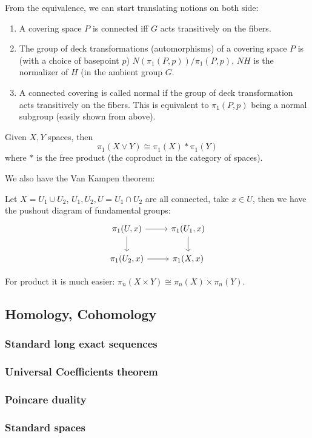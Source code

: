 \documentclass[main.tex]{subfiles}
\begin{document}
\begin{remark}
From the equivalence, we can start translating notions on both side:

\begin{enumerate}
    \item A covering space $P$ is connected iff $G$ acts transitively on the fibers.
    \item The group of deck transformations (automorphisms) of a covering space $P$ is (with a choice of basepoint $p$) $N(\pi_1(P,p))/\pi_1(P,p)$, $NH$ is the normalizer of $H$ (in the ambient group $G$.
    \item A connected covering is called normal if the group of deck transformation acts transitively on the fibers. This is equivalent to $\pi_1(P,p)$ being a normal subgroup (easily shown from above).
\end{enumerate}
\end{remark}

Given $X, Y$ spaces, then 
$$
\pi_1(X \vee Y) \cong \pi_1(X) * \pi_1(Y)
$$
where $*$ is the free product (the coproduct in the category of spaces).

We also have the Van Kampen theorem:
\begin{theorem}
Let $X = U_1 \cup U_2$, $U_1, U_2, U = U_1 \cap U_2$ are all connected, take $x \in U$, then we have the pushout diagram of fundamental groups:
\begin{equation}
    \begin{tikzcd}
\pi_1 (U, x) \arrow[r] \arrow[d]
& \pi_1 (U_1, x) \arrow[d] \\
\pi_1(U_2, x) \arrow[r]
& \pi_1(X,x)
\end{tikzcd}
\end{equation}
\end{theorem}

For product it is much easier:
$\pi_n(X \times Y) \cong \pi_n(X) \times \pi_n(Y)$.

\subsection{Homology, Cohomology}
\subsubsection{Standard long exact sequences}

\subsubsection{Universal Coefficients theorem}


\subsubsection{Poincare duality}


\subsubsection{Standard spaces}
\end{document}
